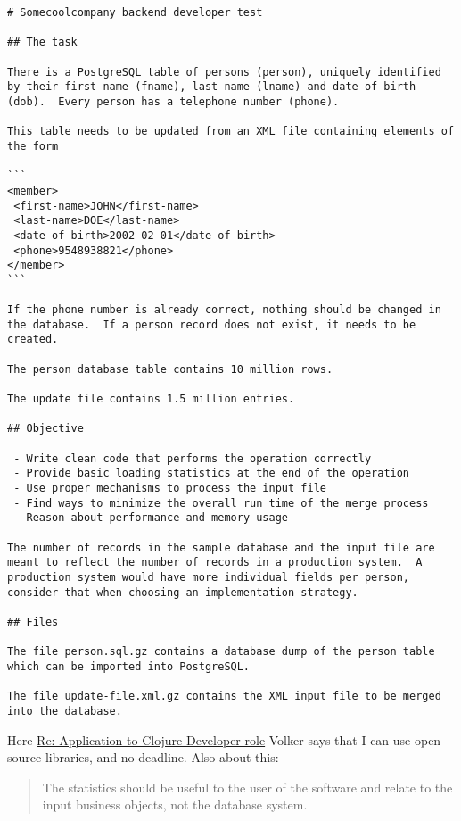 \documentclass[11pt]{article}
\begin{document}
\begin{verbatim}
# Somecoolcompany backend developer test

## The task

There is a PostgreSQL table of persons (person), uniquely identified
by their first name (fname), last name (lname) and date of birth
(dob).  Every person has a telephone number (phone).

This table needs to be updated from an XML file containing elements of
the form

```
<member>
 <first-name>JOHN</first-name>
 <last-name>DOE</last-name>
 <date-of-birth>2002-02-01</date-of-birth>
 <phone>9548938821</phone>
</member>
```

If the phone number is already correct, nothing should be changed in
the database.  If a person record does not exist, it needs to be
created.

The person database table contains 10 million rows.

The update file contains 1.5 million entries.

## Objective

 - Write clean code that performs the operation correctly
 - Provide basic loading statistics at the end of the operation
 - Use proper mechanisms to process the input file
 - Find ways to minimize the overall run time of the merge process
 - Reason about performance and memory usage

The number of records in the sample database and the input file are
meant to reflect the number of records in a production system.  A
production system would have more individual fields per person,
consider that when choosing an implementation strategy.

## Files

The file person.sql.gz contains a database dump of the person table
which can be imported into PostgreSQL.

The file update-file.xml.gz contains the XML input file to be merged
into the database.
\end{verbatim}

Here \href{msgid:CAGYbN5foHViVRTHo-z=+FxnjsbJxCf-7YRWyRXhN8Dz=rh8hbg@mail.gmail.com}{Re: Application to Clojure Developer role} Volker says that I can
use open source libraries, and no deadline. Also about this:
\begin{quote}
The statistics should be useful to the user of the software and relate
to the input business objects, not the database system.
\end{quote}
\end{document}
